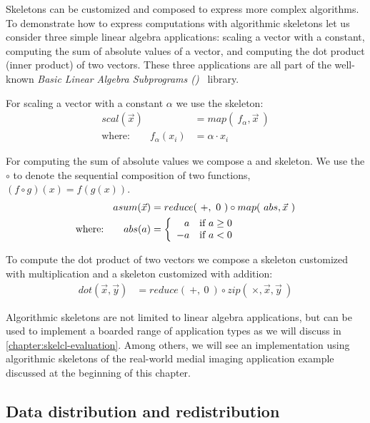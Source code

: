 Skeletons can be customized and composed to express more complex algorithms.
To demonstrate how to express computations with algorithmic skeletons let us consider three simple linear algebra applications:
scaling a vector with a constant, computing the sum of absolute values of a vector, and computing the dot product (\aka inner product) of two vectors.
These three applications are all part of the well-known \emph{Basic Linear Algebra Subprograms (\BLAS)}~\cite{Dongarra2002,Dongarra2002a} library.

For scaling a vector with a constant $\alpha$ we use the \map skeleton:
\begin{align*}
  scal(\vec{x}) &= map(\ f_{\alpha}, \vec{x}\ )\\
  \text{where:} \qquad f_{\alpha}(x_i) &= \alpha \cdot x_i
\end{align*}

\noindent
For computing the sum of absolute values we compose a \map and \reduce skeleton.
We use the $\circ$ to denote the sequential composition of two functions, \ie\ $(f \circ g)(x) = f(g(x))$.
\begin{align*}
  asum(\vec{x}) &= reduce(\ +,\ 0\ ) \circ map(\ abs, \vec{x}\ )\\
  \text{where:} \qquad abs(a) &=
    \left\{
      \begin{array}{r l}
      a & \text{if } a \geq 0\\
      -a & \text{if } a < 0
      \end{array}
    \right.
\end{align*}

\noindent
To compute the dot product of two vectors we compose a \zip skeleton customized with multiplication and a \reduce skeleton customized with addition:
\begin{align*}
  dot(\vec{x}, \vec{y}) &= reduce(\ +,\ 0\ ) \circ zip(\ \times, \vec{x}, \vec{y}\ )
\end{align*}

\noindent
Algorithmic skeletons are not limited to linear algebra applications, but can be used to implement a boarded range of application types as we will discuss in \autoref{chapter:skelcl-evaluation}.
Among others, we will see an implementation using algorithmic skeletons of the real-world medial imaging application example discussed at the beginning of this chapter.


\subsection{Data distribution and redistribution}
\label{section:skelcl-programming-model:distribution}

